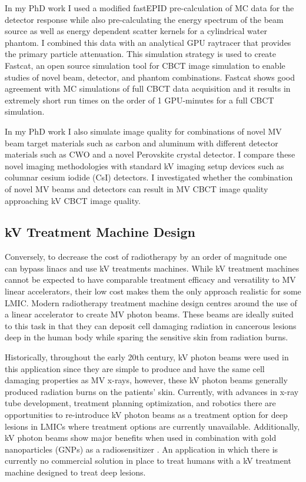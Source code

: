 In my PhD work I used a modified fastEPID pre-calculation of MC data for the detector response while also pre-calculating the energy spectrum of the beam source as well as energy dependent scatter kernels for a cylindrical water phantom. I combined this data with an analytical GPU raytracer that provides the primary particle attenuation. This simulation strategy is used to create Fastcat, an open source simulation tool for CBCT image simulation to enable studies of novel beam, detector, and phantom combinations. Fastcat shows good agreement with MC simulations of full CBCT data acquisition and it results in extremely short run times on the order of 1 GPU-minutes for a full CBCT simulation.

In my PhD work I also simulate image quality for combinations of novel MV beam target materials such as carbon and aluminum with different detector materials such as CWO and a novel Perovskite crystal detector. I compare these novel imaging methodologies with standard kV imaging setup devices such as columnar cesium iodide (CsI) detectors. I investigated whether the combination of novel MV beams and detectors can result in MV CBCT image quality approaching kV CBCT image quality.

\subsection{kV Treatment Machine Design}

Conversely, to decrease the cost of radiotherapy by an order of magnitude one can bypass linacs and use kV treatments machines. While kV treatment machines cannot be expected to have comparable treatment efficacy and versatility to MV linear accelerators, their low cost makes them the only approach realistic for some LMIC. Modern radiotherapy treatment machine design centres around the use of a linear accelerator to create MV photon beams. These beams are ideally suited to this task in that they can deposit cell damaging radiation in cancerous lesions deep in the human body while sparing the sensitive skin from radiation burns. 

Historically, throughout the early 20th century, kV photon beams were used in this application since they are simple to produce and have the same cell damaging properties as MV x-rays, however, these kV photon beams generally produced radiation burns on the patients’ skin. Currently, with advances in x-ray tube development, treatment planning optimization, and robotics there are opportunities to re-introduce kV photon beams as a treatment option for deep lesions in LMICs where treatment options are currently unavailable\cite{Breitkreutz2020ExternalX-rays}. Additionally, kV photon beams show major benefits when used in combination with gold nanoparticles (GNPs) as a radiosensitizer \cite{Sung2018EnergyTherapy}. An application in which there is currently no commercial solution in place to treat humans with a kV treatment machine designed to treat deep lesions.

